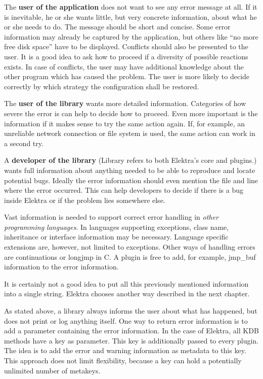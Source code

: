 \begin{DoxyItemize}
\item The {\bfseries user of the application} does not want to see any error message at all. If it is inevitable, he or she wants little, but very concrete information, about what he or she needs to do. The message should be short and concise. Some error information may already be captured by the application, but others like “no more free disk space” have to be displayed. Conflicts should also be presented to the user. It is a good idea to ask how to proceed if a diversity of possible reactions exists. In case of conflicts, the user may have additional knowledge about the other program which has caused the problem. The user is more likely to decide correctly by which strategy the configuration shall be restored.
\item The {\bfseries user of the library} wants more detailed information. Categories of how severe the error is can help to decide how to proceed. Even more important is the information if it makes sense to try the same action again. If, for example, an unreliable network connection or file system is used, the same action can work in a second try.
\item A {\bfseries developer of the library} (Library refers to both Elektra’s core and plugins.) wants full information about anything needed to be able to reproduce and locate potential bugs. Ideally the error information should even mention the file and line where the error occurred. This can help developers to decide if there is a bug inside Elektra or if the problem lies somewhere else.
\item Vast information is needed to support correct error handling in {\itshape other programming languages}. In languages supporting exceptions, class name, inheritance or interface information may be necessary. Language specific extensions are, however, not limited to exceptions. Other ways of handling errors are continuations or {\ttfamily longjmp} in C. A plugin is free to add, for example, {\ttfamily jmp\+\_\+buf} information to the error information.
\end{DoxyItemize}

It is certainly not a good idea to put all this previously mentioned information into a single string. Elektra chooses another way described in the next chapter.

As stated above, a library always informs the user about what has happened, but does not print or log anything itself. One way to return error information is to add a parameter containing the error information. In the case of Elektra, all {\ttfamily K\+DB} methods have a key as parameter. This key is additionally passed to every plugin. The idea is to add the error and warning information as metadata to this key. This approach does not limit flexibility, because a key can hold a potentially unlimited number of metakeys.


